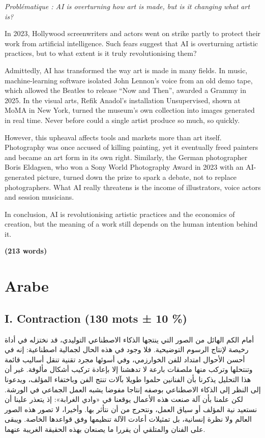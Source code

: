 \documentclass[11pt,a4paper]{article}
\begin{document}
\emph{Problématique : AI is overturning how art is made, but is it changing what art is?}

In 2023, Hollywood screenwriters and actors went on strike partly to protect their work from artificial intelligence. Such fears suggest that AI is overturning artistic practices, but to what extent is it truly revolutionising them?

Admittedly, AI has transformed the way art is made in many fields. In music, machine-learning software isolated John Lennon's voice from an old demo tape, which allowed the Beatles to release ``Now and Then'', awarded a Grammy in 2025. In the visual arts, Refik Anadol's installation Unsupervised, shown at MoMA in New York, turned the museum's own collection into images generated in real time. Never before could a single artist produce so much, so quickly.

However, this upheaval affects tools and markets more than art itself. Photography was once accused of killing painting, yet it eventually freed painters and became an art form in its own right. Similarly, the German photographer Boris Eldagsen, who won a Sony World Photography Award in 2023 with an AI-generated picture, turned down the prize to spark a debate, not to replace photographers. What AI really threatens is the income of illustrators, voice actors and session musicians.

In conclusion, AI is revolutionising artistic practices and the economics of creation, but the meaning of a work still depends on the human intention behind it.

\textbf{(213 words)}

\hypertarget{arabe}{%
\section{Arabe}\label{arabe}}

\hypertarget{i.-contraction-130-mots-10-2}{%
\subsection{I. Contraction (130 mots ± 10 \%)}\label{i.-contraction-130-mots-10-2}}

أمام الكم الهائل من الصور التي ينتجها الذكاء الاصطناعي التوليدي، قد نختزله في أداة رخيصة لإنتاج الرسوم التوضيحية. فلا وجود في هذه الحال لجمالية اصطناعية: إنه في أحسن الأحوال امتداد للفن الخوارزمي، وفي أسوئها مجرد تقنية تنقل أساليب قائمة وتنتحلها وتركب منها ملصقات بارعة لا تدهشنا إلا بإعادة تركيب أشكال مألوفة. غير أن هذا التحليل يذكرنا بأن الفنانين حلموا طويلا بآلات تنتج الفن وباختفاء المؤلف، ويدعونا إلى النظر إلى الذكاء الاصطناعي بوصفه إنتاجا مفوضا يشبه العمل الجماعي في الورشة. لكن علمنا بأن آلة صنعت هذه الأعمال يوقعنا في «وادي الغرابة»: إذ يتعذر علينا أن نستعيد نية المؤلف أو سياق العمل، ونتحرج من أن نتأثر بها. وأخيرا، لا تصور هذه الصور العالم ولا نظرة إنسانية، بل تمثيلات أعادت الآلة تنظيمها وفق قواعدها الخاصة. ويبقى على الفنان والمتلقي أن يقررا ما يصنعان بهذه الحقيقة الغريبة عنهما.
\end{document}
